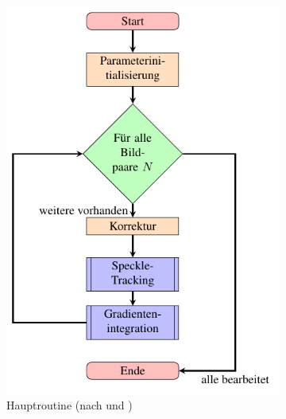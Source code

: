 \begin{figure}[h!]
	\begin{subfigure}[b]{0.45\textwidth}
		\centering
		\includegraphics[width=\textwidth]{pdf/graph_main}
		\caption[Hauptroutine]{Hauptroutine (nach  und \cite{Coj17})}
		\label{fig:graph_hauptroutine}
	\end{subfigure}
	\hfill
	\begin{subfigure}[b]{0.45\textwidth}
		\centering

\end{subfigure}
\end{figure}
